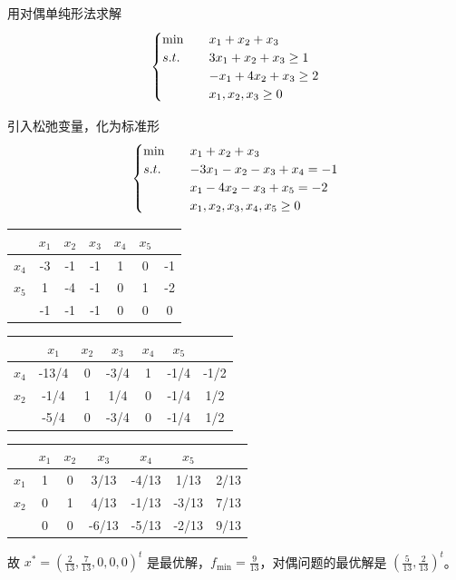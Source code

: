 \begin{example}
    用对偶单纯形法求解
    \[
        \begin{cases}
            \min \quad &x_1 + x_2 + x_3\\
            s.t. \quad &3x_1 + x_2 + x_3 \ge 1\\
            &-x_1 + 4x_2 + x_3 \ge 2\\
            &x_1, x_2, x_3 \ge 0
        \end{cases}    
    \]

    \answer 引入松弛变量，化为标准形
    \[
        \begin{cases}
            \min \quad &x_1 + x_2 + x_3\\
            s.t. \quad &-3x_1 - x_2 - x_3 + x_4 = -1\\
            &x_1 - 4x_2 - x_3 + x_5 = -2\\
            &x_1, x_2, x_3, x_4, x_5 \ge 0
        \end{cases}    
    \]

    \begin{center}
        \begin{tabular}{c|ccccc|c}
            & $x_1$ & $x_2$ & $x_3$ & $x_4$ & $x_5$ & \\
            \hline
            $x_4$ & -3 & -1 & -1 & 1 & 0 & -1\\
            $x_5$ & 1 & {\color{red} -4} & -1 & 0 & 1 & -2\\
            \hline 
            & -1 & -1 & -1 & 0 & 0 & 0
        \end{tabular}

        \begin{tabular}{c|ccccc|c}
            & $x_1$ & $x_2$ & $x_3$ & $x_4$ & $x_5$ & \\
            \hline
            $x_4$ & {\color{red} -13/4} & 0 & -3/4 & 1 & -1/4 & -1/2\\
            $x_2$ & -1/4 & 1 & 1/4 & 0 & -1/4 & 1/2\\
            \hline 
            & -5/4 & 0 & -3/4 & 0 & -1/4 & 1/2
        \end{tabular}

        \begin{tabular}{c|ccccc|c}
            & $x_1$ & $x_2$ & $x_3$ & $x_4$ & $x_5$ & \\
            \hline
            $x_1$ & 1 & 0 & 3/13 & -4/13 & 1/13 & 2/13\\
            $x_2$ & 0 & 1 & 4/13 & -1/13 & -3/13 & 7/13\\
            \hline 
            & 0 & 0 & -6/13 & -5/13 & -2/13 & 9/13
        \end{tabular}
    \end{center}
    故 $x^* = (\frac{2}{13}, \frac{7}{13}, 0, 0, 0)^t$ 是最优解，$f_{\min} = \frac{9}{13}$，对偶问题的最优解是 $(\frac{5}{13}, \frac{2}{13})^t$。
\end{example}

